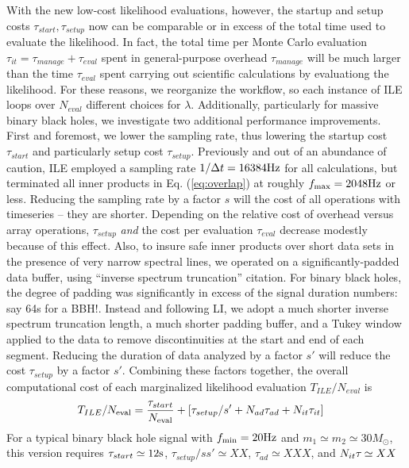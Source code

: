 \documentclass[twocolumn,prd,nofootinbib]{revtex4}
\newcommand\unit[1]{{\rm #1}}
\newcommand\ILE{ILE}
\newcommand\editremark[1]{{\color{red} #1}}
\begin{document}
With the new low-cost likelihood evaluations, however, the startup and setup costs  $\tau_{start},\tau_{setup}$ now can be
comparable or in excess of the total time used to evaluate the likelihood.   In fact, the total time per Monte Carlo
evaluation $\tau_{it}=\tau_{manage}+\tau_{eval}$  spent in general-purpose overhead $\tau_{manage}$ will be much larger than the time $\tau_{eval}$ spent
carrying out scientific calculations by evaluationg the likelihood.  For these reasons, we reorganize the workflow, so each
instance of ILE loops over
$N_{eval}$ different choices for $\lambda$. 
%
Additionally, particularly for massive binary black holes, we investigate two additional performance improvements.  First and
foremost, we lower the sampling rate, thus lowering the startup cost $\tau_{start}$ and particularly setup cost
$\tau_{setup}$.  Previously and out of an abundance of caution, \ILE{} employed a sampling rate $1/\Delta t = 16384
\unit{Hz}$ for all calculations, but terminated all inner products in Eq. (\ref{eq:overlap}) at roughly $f_{\rm
  max}=2048\unit{Hz}$ or less.   Reducing the sampling rate by a factor $s$ will the  cost of all operations with
timeseries -- they are shorter.  Depending on the relative cost of overhead versus array operations,  $\tau_{setup}$
\emph{and} the cost per evaluation $\tau_{eval}$ decrease modestly because of this effect.  
Also, to insure safe inner products over short data sets in the presence of very narrow spectral lines, we operated on a
significantly-padded data buffer,
using 
``inverse spectrum truncation'' \editremark{citation}.  For binary black holes, the degree of padding was significantly
in excess of the signal duration \editremark{numbers: say 64s for a BBH!}.  
Instead and following LI, we adopt a much shorter inverse spectrum truncation length, a much shorter padding buffer, and
a Tukey window applied to the data to remove discontinuities at the start and end of each segment.   
Reducing the duration of data analyzed by a factor $s'$ will reduce the cost $\tau_{setup}$ by a factor $s'$.  
%
Combining these factors together, the overall computational cost of each marginalized likelihood
evaluation $T_{ILE}/N_{eval}$  is
\begin{align}
T_{ILE}/N_{\rm eval} &= \frac{\tau_{start}}{N_{\rm eval}} 
 + 
 [ \tau_{setup}/s' + N_{ad} \tau_{ad} + N_{it}\tau_{it}
 ] 
\end{align}
For a typical binary black hole signal with $f_{\rm min}=20 \unit{Hz}$ and $m_1\simeq m_2\simeq 30 M_\odot$, this
version requires $\tau_{start} \simeq 12\unit{s}$, $\tau_{setup}/ss' \simeq XX$, $\tau_{ad}\simeq XXX$, and $N_{it}\tau_{\it} \simeq XX$
\end{document}
